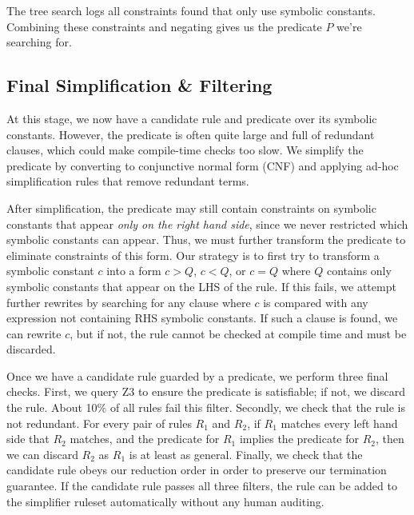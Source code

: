 \documentclass[sigplan,10pt,review,anonymous]{acmart}\settopmatter{printfolios=true,printccs=false,printacmref=false}
\begin{document}
The tree search logs all constraints found that only use symbolic constants.  Combining
these constraints and negating gives us the predicate $P$ we're searching for.

\subsection{Final Simplification \& Filtering} At this stage, we now have a candidate
rule and predicate over its symbolic constants.  However, the predicate is often quite
large and full of redundant clauses, which could make compile-time checks too slow.
We simplify the predicate by converting to conjunctive normal form (CNF) and applying
ad-hoc simplification rules that remove redundant terms.

After simplification, the predicate may still contain constraints on symbolic constants
that appear \textit{only on the right hand side}, since we never restricted which symbolic constants
 can appear.  Thus, we must further transform the predicate to eliminate
constraints of this form.  Our strategy is to first try to transform a symbolic constant
$c$ into a form $c > Q$, $c < Q$, or $c = Q$ where $Q$ contains only symbolic constants
that appear on the LHS of the rule.  If this fails, we attempt further rewrites by
searching for any clause where $c$ is compared with any expression not containing RHS
symbolic constants.  If such a clause is found, we can rewrite $c$, but if not, the rule
cannot be checked at compile time and must be discarded.

Once we have a candidate rule guarded by a predicate, we perform three final checks.
First, we query Z3 to ensure the
predicate is satisfiable; if not, we discard the rule.  About 10\% of all rules fail
this filter.  Secondly, we check that the rule is not redundant.  For every pair of
rules $R_1$ and $R_2$, if $R_1$ matches every left hand side that $R_2$ matches,
and the predicate for $R_1$ implies the predicate for $R_2$, then we can discard $R_2$
as $R_1$ is at least as general. Finally, we check that the candidate rule obeys our
reduction order in order to preserve our termination guarantee. If the candidate rule passes all three filters, the rule can be added to the simplifier ruleset automatically without any human auditing.
\end{document}
